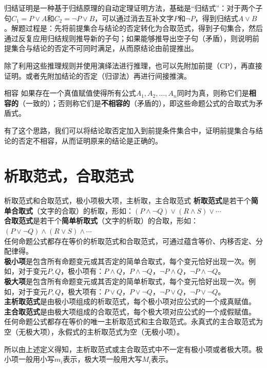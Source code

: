 \documentclass[lang=cn,11pt]{elegantbook}
\begin{document}
归结证明是一种基于归结原理的自动定理证明方法，基础是“归结式”：对于两个子句$C_1 = P \lor A$和$C_2 = \neg P \lor B$，可以通过消去互补文字$P$和$\neg P$，得到归结式$A \lor B$。解题过程是：先将前提集合与结论的否定转化为合取范式，得到子句集合，然后通过反复应用归结规则推导新的子句；如果能够推导出空子句（矛盾），则说明前提集合与结论的否定不可同时满足，从而原结论由前提推出。

除了利用这些推理规则并使用演绎法进行推理，也可以先附加前提（CP），再直接证明。或者先附加结论的否定（归谬法）再进行间接推演。
\begin{definition}{相容}
    如果存在一个真值赋值使得所有公式$A_1, A_2, \ldots, A_n$同时为真，则称它们是\textbf{相容的}（一致的）；否则称它们是\textbf{不相容的}（矛盾的），即这些命题公式的合取式为矛盾式。
\end{definition}
有了这个思路，我们可以将结论取否定加入到前提条件集合中，证明前提集合与结论的否定不相容，从而证明原来的结论是正确的。
\section{析取范式，合取范式}
\begin{definition}{析取范式和合取范式，极小项极大项，主析取，主合取范式}
\textbf{析取范式}是若干个\textbf{简单合取式}（文字的合取）的析取，形如：$(P \land \neg Q) \lor (R \land S) \lor \cdots$\\
\textbf{合取范式}是若干个\textbf{简单析取式}（文字的析取）的合取，形如：$(P \lor \neg Q) \land (R \lor S) \land \cdots$\\
任何命题公式都存在等价的析取范式和合取范式，可通过蕴含等价、内移否定、分配律得。\\
\textbf{极小项}是包含所有命题变元或其否定的简单合取式，每个变元恰好出现一次。例如，对于变元$P,Q$，极小项有：$P \land Q$，$P \land \neg Q$，$\neg P \land Q$，$\neg P \land \neg Q$。\\
\textbf{极大项}是包含所有命题变元或其否定的简单析取式，每个变元恰好出现一次。例如，对于变元$P,Q$，极大项有：$P \lor Q$，$P \lor \neg Q$，$\neg P \lor Q$，$\neg P \lor \neg Q$。\\
\textbf{主析取范式}是由极小项组成的析取范式，每个极小项对应公式的一个成真赋值。\\
\textbf{主合取范式}是由极大项组成的合取范式，每个极大项对应公式的一个成假赋值。\\
任何命题公式都存在等价的唯一主析取范式和主合取范式。永真式的主合取范式为空（无极大项），永假式的主析取范式为空（无极小项）。
\end{definition}
所以由上述定义得知，主析取范式或主合取范式中不一定有极小项或者极大项。极小项一般用小写$m_i$表示，极大项一般用大写$M_i$表示。
\end{document}

